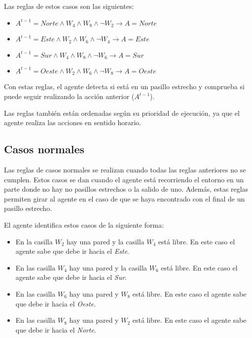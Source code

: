 \FloatBarrier

Las reglas de estos casos son las siguientes:

\begin{itemize}
    \item \emph{$A^{t-1} = Norte \land W_{4} \land W_{8} \land \neg W_{2} \longrightarrow A = Norte $}
    \item \emph{$A^{t-1} = Este \land W_{2} \land W_{6} \land \neg W_{4} \longrightarrow A = Este $}
    \item \emph{$A^{t-1} = Sur \land W_{4} \land W_{8} \land \neg W_{6} \longrightarrow A = Sur $}
    \item \emph{$A^{t-1} = Oeste \land W_{2} \land W_{6} \land \neg W_{8} \longrightarrow A = Oeste $}
\end{itemize}

Con estas reglas, el agente detecta si está en un pasillo estrecho y comprueba si puede seguir realizando la acción anterior (\emph{$A^{t-1}$}).

Las reglas también están ordenadas según su prioridad de ejecución, ya que el agente realiza las acciones en sentido horario.

\subsection{Casos normales}
Las reglas de casos normales se realizan cuando todas las reglas anteriores no se cumplen. Estos casos se dan cuando el agente está recorriendo el entorno en un parte donde no hay no pasillos estrechos o la salido de uno. Además, estas reglas permiten girar al agente en el caso de que se haya encontrado con el final de un pasillo estrecho.

El agente identifica estos casos de la siguiente forma:
\begin{itemize}
    \item En la casilla \emph{$W_{2}$} hay una pared y la casilla \emph{$W_{4}$} está libre. En este caso el agente sabe que debe ir hacia el \emph{Este}.
    
    \item En las casilla \emph{$W_{4}$} hay una pared y la casilla \emph{$W_{6}$} está libre. En este caso el agente sabe que debe ir hacia el \emph{Sur}.
    
    \item En las casilla \emph{$W_{6}$} hay una pared y \emph{$W_{8}$} está libre. En este caso el agente sabe que debe ir hacia el \emph{Oeste}.
    
    \item En las casilla \emph{$W_{8}$} hay una pared y \emph{$W_{2}$} está libre. En este caso el agente sabe que debe ir hacia el \emph{Norte}.
\end{itemize}

